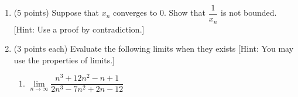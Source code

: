 \documentclass[fleqn]{article}
\begin{document}
\begin{enumerate}
      \textcolor{hwColor}{
        \\
        \textbf{Basis: $k=1$}
        \\
        \\
        $
          1=1 \Longrightarrow L.H.S=R.H.S ~~~~ \checkmark 
        $
        \\
        \\
        \textbf{Induction:}
        \\
        \\
        Assume $1+2+...+n=\dfrac{n(n+1)}{2}$ is true for some $n=w$. Therefore, $1+2+...+w=\dfrac{w(w+1)}{2}$.
        \\
        \\
        Now we need to show that the statement is also true for $n=w+1$.
        \\
        \\
        $
          1+2+...+w+(w+1)=\dfrac{(w+1)\left[(w+1)+1\right]}{2}
          \\
          \\
          \\
          \therefore ~~~~ \dfrac{w(w+1)}{2}+(w+1)=\dfrac{(w+1)(k+2)}{2}
          \\
          \\
          \\
          \therefore ~~~~ \dfrac{w(w+1)}{2}+\dfrac{2(w+1)}{2}=\dfrac{(w+1)(w+2)}{2}
          \\
          \\
          \\
          \therefore ~~~~ w(w+1)+2(w+1)=(w+1)(w+2)
          \\
          \\
          \\
          \therefore ~~~~ w^2+w+2w+2=w^2+2w+w+2 ~~~~ \checkmark
        $
        \\
        \\
        So we basically showed that this is true for $n=w+1$.
      }


    \item (5 points) Suppose that $x_n$ converges to $0$. Show that $\dfrac{1}{x_n}$ is not bounded. 
    [Hint: Use a proof by contradiction.]




    \item (3 points each) Evaluate the following limits when they exists [Hint: You may use the
    properties of limits.]
    \begin{enumerate}
      \item $\lim\limits_{n\to\infty} \dfrac{n^3+12n^2-n+1}{2n^3-7n^2+2n-12}$


\end{enumerate}
\end{enumerate}
\end{document}
